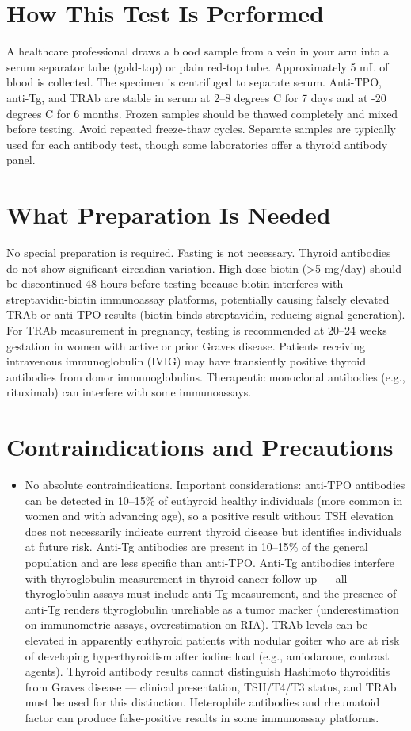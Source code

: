\section*{How This Test Is Performed}
A healthcare professional draws a blood sample from a vein in your arm into a serum separator tube (gold-top) or plain red-top tube. Approximately 5 mL of blood is collected. The specimen is centrifuged to separate serum. Anti-TPO, anti-Tg, and TRAb are stable in serum at 2--8 degrees C for 7 days and at -20 degrees C for 6 months. Frozen samples should be thawed completely and mixed before testing. Avoid repeated freeze-thaw cycles. Separate samples are typically used for each antibody test, though some laboratories offer a thyroid antibody panel.

\section*{What Preparation Is Needed}
No special preparation is required. Fasting is not necessary. Thyroid antibodies do not show significant circadian variation. High-dose biotin (>5 mg/day) should be discontinued 48 hours before testing because biotin interferes with streptavidin-biotin immunoassay platforms, potentially causing falsely elevated TRAb or anti-TPO results (biotin binds streptavidin, reducing signal generation). For TRAb measurement in pregnancy, testing is recommended at 20--24 weeks gestation in women with active or prior Graves disease. Patients receiving intravenous immunoglobulin (IVIG) may have transiently positive thyroid antibodies from donor immunoglobulins. Therapeutic monoclonal antibodies (e.g., rituximab) can interfere with some immunoassays.

\section*{Contraindications and Precautions}
\begin{itemize}
  \item No absolute contraindications. Important considerations: anti-TPO antibodies can be detected in 10--15\% of euthyroid healthy individuals (more common in women and with advancing age), so a positive result without TSH elevation does not necessarily indicate current thyroid disease but identifies individuals at future risk. Anti-Tg antibodies are present in 10--15\% of the general population and are less specific than anti-TPO. Anti-Tg antibodies interfere with thyroglobulin measurement in thyroid cancer follow-up --- all thyroglobulin assays must include anti-Tg measurement, and the presence of anti-Tg renders thyroglobulin unreliable as a tumor marker (underestimation on immunometric assays, overestimation on RIA). TRAb levels can be elevated in apparently euthyroid patients with nodular goiter who are at risk of developing hyperthyroidism after iodine load (e.g., amiodarone, contrast agents). Thyroid antibody results cannot distinguish Hashimoto thyroiditis from Graves disease --- clinical presentation, TSH/T4/T3 status, and TRAb must be used for this distinction. Heterophile antibodies and rheumatoid factor can produce false-positive results in some immunoassay platforms.
\end{itemize}
